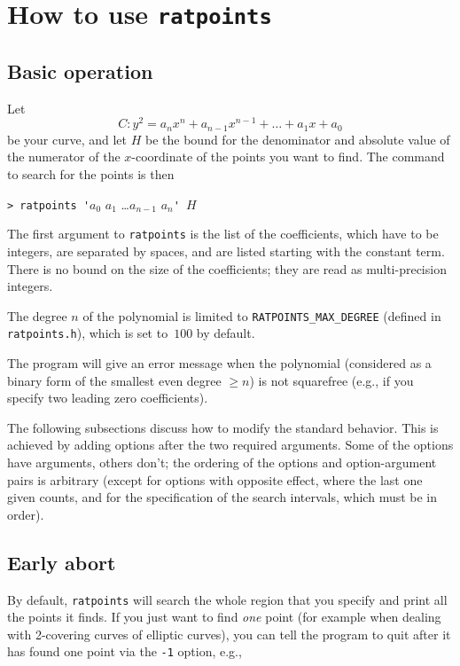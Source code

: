 \documentclass[12pt,a4paper,oneside]{amsart}
\begin{document}

\section{How to use \texttt{ratpoints}}

\subsection{Basic operation}

Let
\[ C : y^2 = a_n x^n + a_{n-1} x^{n-1} + \dots + a_1 x + a_0 \]
be your
curve, and let $H$ be the bound for the denominator and absolute value
of the numerator of the $x$-coordinate of the points you want to find.
The command to search for the points is then

\verb+> ratpoints '+$a_0$ $a_1$ \dots $a_{n-1}$ $a_n$\verb+' +$H$

The first argument to \texttt{ratpoints} is the list of the coefficients,
which have to be integers, are separated by spaces, and are listed
starting with the constant term. There is no bound on the size of the
coefficients; they are read as multi-precision integers.

The degree $n$ of the polynomial is limited to \texttt{RATPOINTS\_MAX\_DEGREE}
(defined in \texttt{ratpoints.h}), which is set to~$100$ by default.

The program will give an error message when the polynomial (considered
as a binary form of the smallest even degree $\ge n$) is not squarefree
(e.g., if you specify two leading zero coefficients).

The following subsections discuss how to modify the standard behavior.
This is achieved by adding options after the two required arguments.
Some of the options have arguments, others don't; the ordering of
the options and option-argument pairs is arbitrary (except for options
with opposite effect, where the last one given counts, and for the
specification of the search intervals, which must be in order).

\subsection{Early abort}

By default, \texttt{ratpoints} will search the whole region that you specify
and print all the points it finds. If you just want to find {\em one}
point (for example when dealing with 2-covering curves of elliptic curves),
you can tell the program to quit after it has found one point via the
\verb+-1+ option, e.g.,
\end{document}
